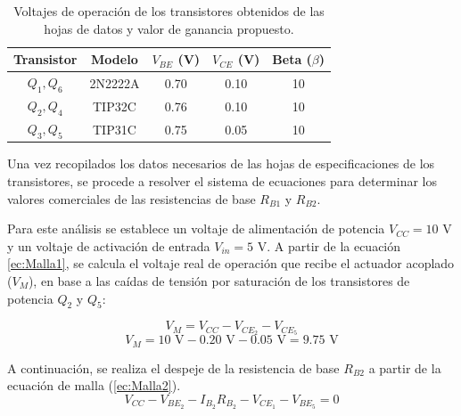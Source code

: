 \documentclass[journal]{IEEEtran}
\begin{document}
    \begin{table}[H]
    \centering
    \caption{Voltajes de operación de los transistores obtenidos de las hojas de datos y 
    valor de ganancia propuesto.}
    \label{tab:voltajes_transistores}
    \begin{tabular}{ccccc}
        \hline
        \textbf{Transistor} & \textbf{Modelo} & \textbf{$V_{BE}$ (V)} & \textbf{$V_{CE}$ (V)} & \textbf{Beta ($\beta$)} \\ \hline
        $Q_1, Q_6$          & 2N2222A         & 0.70                  & 0.10                  & 10                       \\ \hline
        $Q_2, Q_4$          & TIP32C          & 0.76                  & 0.10                  & 10                       \\ \hline
        $Q_3, Q_5$          & TIP31C          & 0.75                  & 0.05                  & 10                       \\ \hline
    \end{tabular}
    \end{table}

    Una vez recopilados los datos necesarios de las hojas de especificaciones de los transistores, 
    se procede a resolver el sistema de ecuaciones para determinar los valores comerciales de las 
    resistencias de base $R_{B1}$ y $R_{B2}$. 
    
    Para este análisis se establece un voltaje de alimentación de potencia $V_{CC} = 10\text{ V}$ y un voltaje de activación de entrada $V_{in} = 5\text{ V}$. 
    A partir de la ecuación \ref{ec:Malla1}, se calcula el voltaje real de operación que 
    recibe el actuador acoplado ($V_M$), en base a las caídas de tensión por saturación de 
    los transistores de potencia $Q_2$  y $Q_5$:

    \begin{equation*}
        V_{M} = V_{CC} - V_{CE_{2}} - V_{CE_{5}}
    \end{equation*}
    \begin{equation*}
        V_{M} = 10\text{ V} - 0.20\text{ V} - 0.05\text{ V} = 9.75\text{ V}
    \end{equation*}

    A continuación, se realiza el despeje de la resistencia de base $R_{B2}$ a partir de la ecuación de malla (\ref{ec:Malla2}). 
    \begin{equation*}
        V_{CC} - V_{BE_{2}} - I_{B_{2}} R_{B_{2}} - V_{CE_{1}} - V_{BE_{5}} = 0
    \end{equation*}
\end{document}
